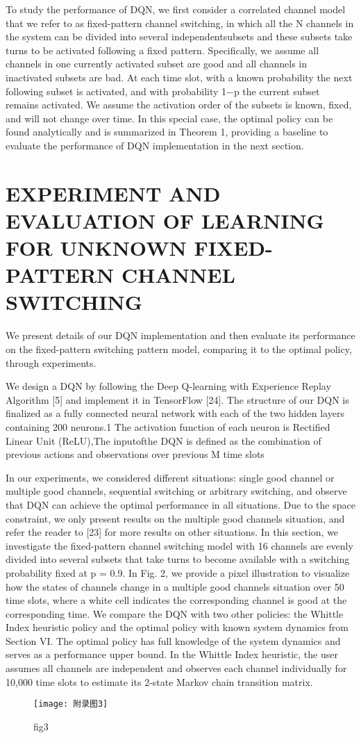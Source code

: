 To study the performance of DQN, we ﬁrst consider a correlated channel model that we refer to as ﬁxed-pattern channel switching, in which all the N channels in the system can be divided into several independentsubsets and these subsets take turns to be activated following a ﬁxed pattern. Speciﬁcally, we assume all channels in one currently activated subset are good and all channels in inactivated subsets are bad. At each time slot, with a known probability the next following subset is activated, and with probability 1−p the current subset remains activated. We assume the activation order of the subsets is known, ﬁxed, and will not change over time. In this special case, the optimal policy can be found analytically and is summarized in Theorem 1, providing a baseline to evaluate the performance of DQN implementation in the next section. 

\section*{  EXPERIMENT AND EVALUATION OF LEARNING FOR UNKNOWN FIXED-PATTERN CHANNEL SWITCHING     }
We present details of our DQN implementation and then evaluate its performance on the ﬁxed-pattern switching pattern model, comparing it to the optimal policy, through experiments.

We design a DQN by following the Deep Q-learning with Experience Replay Algorithm [5] and implement it in TensorFlow [24]. The structure of our DQN is ﬁnalized as a fully connected neural network with each of the two hidden layers containing 200 neurons.1 The activation function of each neuron is Rectiﬁed Linear Unit (ReLU),The inputofthe DQN is deﬁned as the combination of previous actions and observations over previous M time slots

In our experiments, we considered different situations: single good channel or multiple good channels, sequential switching or arbitrary switching, and observe that DQN can achieve the optimal performance in all situations. Due to the space constraint, we only present results on the multiple good channels situation, and refer the reader to [23] for more results on other situations. In this section, we investigate the ﬁxed-pattern channel switching model with 16 channels are evenly divided into several subsets that take turns to become available with a switching probability ﬁxed at p = 0.9. In Fig. 2, we provide a pixel illustration to visualize how the states of channels change in a multiple good channels situation over 50 time slots, where a white cell indicates the corresponding channel is good at the corresponding time. We compare the DQN with two other policies: the Whittle Index heuristic policy and the optimal policy with known system dynamics from Section VI. The optimal policy has full knowledge of the system dynamics and serves as a performance upper bound. In the Whittle Index heuristic, the user assumes all channels are independent and observes each channel individually for 10,000 time slots to estimate its 2-state Markov chain transition matrix.
\begin{figure}[h]
	\centering
	\texttt{[image: 附录图3]}
	\caption{fig3}
\end{figure}

